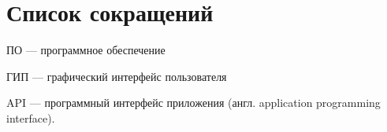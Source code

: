 \section*{Список сокращений}

ПО — программное обеспечение

ГИП — графический интерфейс пользователя

API — программный интерфейс приложения (англ. application programming
        interface).
